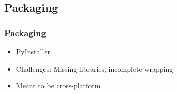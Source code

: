 \documentclass[9pt]{beamer}
\begin{document}
		\subsection{Packaging}
			\begin{frame}
				\frametitle{Packaging}
				\begin{itemize}
					\item PyInstaller
					\item Challenges: Missing libraries, incomplete wrapping
					\item Meant to be cross-platform
				\end{itemize}
		    		
			\end{frame}
			
%		
%			
%			
%		    	
\end{document}
